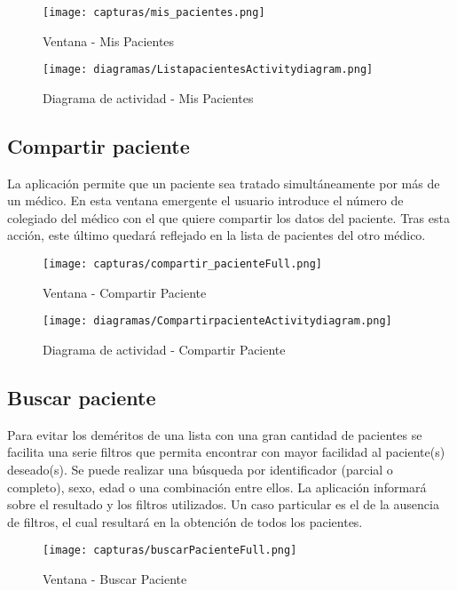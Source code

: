 \documentclass[11pt,spanish,
		listoftables,listoffigures]
		{tfgplantilla}
\begin{document}
\begin{figure}[H]
\centering
\texttt{[image: capturas/mis\_pacientes.png]}
\caption{Ventana - Mis Pacientes}
\end{figure}

\begin{figure}[H]
\centering
\texttt{[image: diagramas/ListapacientesActivitydiagram.png]}
\caption{Diagrama de actividad - Mis Pacientes}
\end{figure}

\subsection {Compartir paciente}

La aplicación permite que un paciente sea tratado simultáneamente  por más de un médico. En esta ventana emergente el usuario introduce el número de colegiado del médico con el que quiere compartir los datos del paciente. Tras esta acción, este último quedará reflejado en la lista de pacientes del otro médico.

\begin{figure}[H]
\centering
\texttt{[image: capturas/compartir\_pacienteFull.png]}
\caption{Ventana - Compartir Paciente}
\end{figure}

\begin{figure}[H]
\centering
\texttt{[image: diagramas/CompartirpacienteActivitydiagram.png]}
\caption{Diagrama de actividad - Compartir Paciente}
\end{figure}

\newpage
\subsection {Buscar paciente}

Para evitar los deméritos de una lista con una gran cantidad de pacientes se facilita una serie filtros que permita encontrar con mayor facilidad al paciente(s) deseado(s). Se puede realizar una búsqueda  por identificador (parcial o completo), sexo, edad o una combinación entre ellos. La aplicación informará sobre el resultado y los filtros utilizados. Un caso particular es el de la ausencia de filtros, el cual resultará en la obtención de todos los pacientes.

\begin{figure}[H]
\centering
\texttt{[image: capturas/buscarPacienteFull.png]}
\caption{Ventana - Buscar Paciente}
\end{figure}
\end{document}
